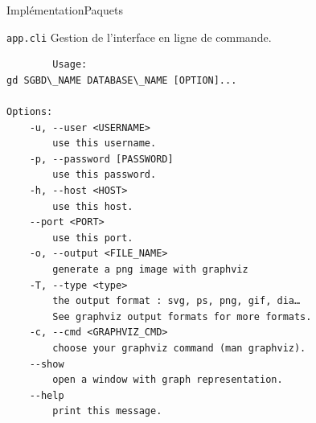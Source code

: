 \begin{frame}[containsverbatim]{Implémentation}{Paquets}
	\begin{block}{\texttt{app.cli}}
	Gestion de l'interface en ligne de commande.
	\tiny
		\begin{verbatim}
		Usage:
gd SGBD\_NAME DATABASE\_NAME [OPTION]...

Options:
    -u, --user <USERNAME>
        use this username.
    -p, --password [PASSWORD]
        use this password.
    -h, --host <HOST>
        use this host.
    --port <PORT>
        use this port.
    -o, --output <FILE_NAME>
        generate a png image with graphviz
    -T, --type <type>
        the output format : svg, ps, png, gif, dia… 
        See graphviz output formats for more formats.
    -c, --cmd <GRAPHVIZ_CMD>
        choose your graphviz command (man graphviz).
    --show 
        open a window with graph representation.
    --help
        print this message.
	\end{verbatim}
	\end{block}
\end{frame}

